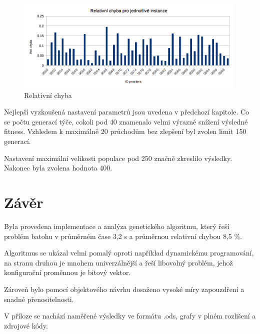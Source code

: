 \documentclass[a4paper]{article}
\begin{document}
	\begin{figure}[h]\centering
		\includegraphics[width=0.99\textwidth]{rel-chyba.png} 
		\caption{Relativní chyba}
		\label{error}
	\end{figure}
	
	Nejlepší vyzkoušená nastavení parametrů jsou uvedena v předchozí kapitole. Co se počtu generací týče, cokoli pod 40 znamenalo velmi výrazné snížení výsledné fitness. Vzhledem k maximálně 20 průchodům bez zlepšení byl zvolen limit 150 generací.
	
	Nastavení maximální velikosti populace pod 250 značně zkreslilo výsledky. Nakonec byla zvolena hodnota 400.
	
\section{Závěr}
	Byla provedena implementace a analýza genetického algoritmu, který řeší problém batohu v průměrném čase 3,2 s a průměrnou relativní chybou 8,5 \%.
	
	Algoritmus se ukázal velmi pomalý oproti například dynamickému programování, na stranu druhou je mnohem univerzálnější a řeší libovolný problém, jehož konfigurační proměnnou je bitový vektor.
	
	Zároveň bylo pomocí objektového návrhu dosaženo vysoké míry zapouzdření a snadné přenositelnosti.

	V příloze se nachází naměřené výsledky ve formátu .ods, grafy v plném rozlišení a zdrojové kódy.
\end{document}
